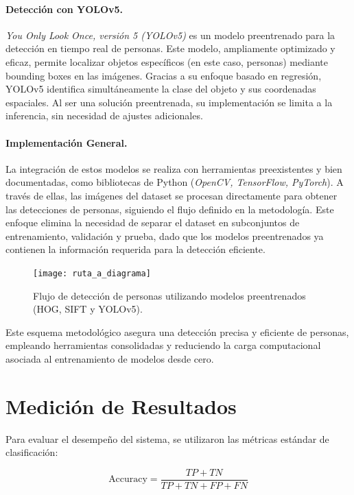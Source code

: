 \paragraph{Detección con YOLOv5.} \textit{You Only Look Once, versión 5 (YOLOv5)} es un modelo preentrenado para la detección en tiempo real de personas. Este modelo, ampliamente optimizado y eficaz, permite localizar objetos específicos (en este caso, personas) mediante bounding boxes en las imágenes. Gracias a su enfoque basado en regresión, YOLOv5 identifica simultáneamente la clase del objeto y sus coordenadas espaciales. Al ser una solución preentrenada, su implementación se limita a la inferencia, sin necesidad de ajustes adicionales.

\paragraph{Implementación General.} La integración de estos modelos se realiza con herramientas preexistentes y bien documentadas, como bibliotecas de Python (\textit{OpenCV, TensorFlow, PyTorch}). A través de ellas, las imágenes del dataset se procesan directamente para obtener las detecciones de personas, siguiendo el flujo definido en la metodología. Este enfoque elimina la necesidad de separar el dataset en subconjuntos de entrenamiento, validación y prueba, dado que los modelos preentrenados ya contienen la información requerida para la detección eficiente.

\begin{figure}[H]
    \centering
    \texttt{[image: ruta\_a\_diagrama]}
    \caption{Flujo de detección de personas utilizando modelos preentrenados (HOG, SIFT y YOLOv5).}
    \label{fig:deteccion_personas}
\end{figure}

Este esquema metodológico asegura una detección precisa y eficiente de personas, empleando herramientas consolidadas y reduciendo la carga computacional asociada al entrenamiento de modelos desde cero.


\section{Medición de Resultados}

Para evaluar el desempeño del sistema, se utilizaron las métricas estándar de clasificación:

\begin{equation}
\text{Accuracy} = \frac{TP + TN}{TP + TN + FP + FN}
\end{equation}

